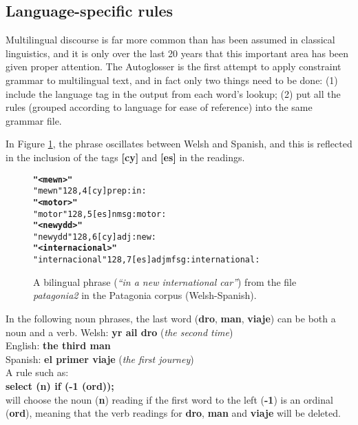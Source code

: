 \documentclass[11pt]{article}
\begin{document}
\subsection{Language-specific rules}
\label{sec:langspec}


Multilingual discourse is far more common than has been assumed in classical linguistics, and it is only over the last 20 years that this important area has been given proper attention.  The Autoglosser is the first attempt to apply constraint grammar to multilingual text, and in fact only two things need to be done: (1) include the language tag in the output from each word's lookup; (2) put all the rules (grouped according to language for ease of reference) into the same grammar file. 

In Figure \ref{bilingual}, the phrase oscillates between Welsh and Spanish, and this is reflected in the inclusion of the tags \textbf{[cy]} and \textbf{[es]} in the readings.

\begin{figure}[!hbtp]
\centering
\begin{footnotesize}
\begin{alltt}
\normalfont
\textbf{"<mewn>"}
    "mewn" {128,4} [cy] prep :in:
\textbf{"<motor>"}
    "motor" {128,5} [es] n m sg :motor:
\textbf{"<newydd>"}
    "newydd" {128,6} [cy] adj :new:
\textbf{"<internacional>"}
    "internacional" {128,7} [es] adj mf sg :internat\-ional:
\end{alltt}
\end{footnotesize}
\caption{A bilingual phrase (\textit{``in a new international car''}) from the file \textit{patagonia2} in the Patagonia corpus (Welsh-Spanish).}
\label{bilingual}
\end{figure}

In the following noun phrases, the last word (\textbf{dro}, \textbf{man}, \textbf{viaje}) can be both a noun and a verb.
\indent Welsh: \textbf{yr ail dro} (\textit{the second time}) \\
\indent English: \textbf{the third man} \\
\indent Spanish: \textbf{el primer viaje} (\textit{the first journey}) \\
A rule such as: \\
\indent\textbf{select (n) if (-1 (ord));} \\
will choose the noun (\textbf{n}) reading if the first word to the left (\textbf{-1}) is an ordinal (\textbf{ord}), meaning that the verb readings for \textbf{dro}, \textbf{man} and \textbf{viaje} will be deleted.
\end{document}
